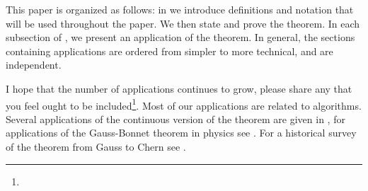 This paper is organized as follows:
in  we introduce definitions and notation that will be used
throughout the paper. We then state and prove the theorem.
In each subsection of , we present an application of the theorem.
In general, the sections containing applications are ordered from simpler to more technical,
and are independent.


I hope that the number of applications continues to grow,
please share any that you feel
ought to be included\footnote{}.
Most of our applications are related to algorithms. 
Several applications of the continuous version of the theorem
are given in \cite{doc76,pressley_elementary_2010}, for applications of the Gauss-Bonnet 
theorem in physics see \cite{tirado-physics-apps,gibbons_applications_2008}.
For a historical survey of the theorem from Gauss to Chern see  \cite{wu_historical_2008}.